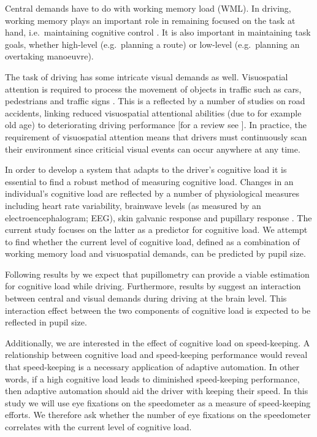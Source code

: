 Central demands have to do with working memory load (WML).
In driving, working memory plays an important role in remaining focused on the task at hand, i.e.\ maintaining cognitive control \citep{Wood2016}.
It is also important in maintaining task goals, whether high-level (e.g.\ planning a route) or low-level (e.g.\ planning an overtaking manoeuvre).

The task of driving has some intricate visual demands as well.
Visuospatial attention is required to process the movement of objects in traffic such as cars, pedestrians and traffic signs \citep{Zheng2020}.
This is a reflected by a number of studies on road accidents, linking reduced visuospatial attentional abilities (due to for example old age) to deteriorating driving performance [for a review see \citet{Owsley2010}].
In practice, the requirement of visuospatial attention means that drivers must continuously scan their environment since criticial visual events can occur anywhere at any time.

In order to develop a system that adapts to the driver's cognitive load it is essential to find a robust method of measuring cognitive load.
Changes in an individual's cognitive load are reflected by a number of physiological measures including heart rate variability, brainwave levels (as measured by an electroencephalogram; EEG), skin galvanic response and pupillary response \citep{Haapalainen2010}.
The current study focuses on the latter as a predictor for cognitive load. We attempt to find whether the current level of cognitive load, defined as a combination of working memory load and visuospatial demands, can be predicted by pupil size.

Following results by \citet{Palinko2010} we expect that pupillometry can provide a viable estimation for cognitive load while driving. 
Furthermore, results by \citet{Scheunemann2019} suggest an interaction between central and visual demands during driving at the brain level.
This interaction effect between the two components of cognitive load is expected to be reflected in pupil size.

Additionally, we are interested in the effect of cognitive load on speed-keeping.
A relationship between cognitive load and speed-keeping performance would reveal that speed-keeping is a necessary application of adaptive automation. 
In other words, if a high cognitive load leads to diminished speed-keeping performance, then adaptive automation should aid the driver with keeping their speed.
In this study we will use eye fixations on the speedometer as a measure of speed-keeping efforts. We therefore ask whether the number of eye fixations on the speedometer correlates with the current level of cognitive load.


